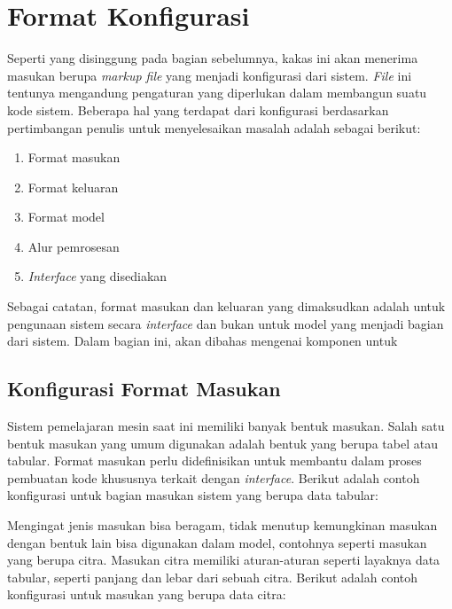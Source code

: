 \section{Format Konfigurasi}

Seperti yang disinggung pada bagian sebelumnya, kakas ini akan menerima masukan berupa \textit{markup file} yang menjadi konfigurasi dari sistem.
\textit{File} ini tentunya mengandung pengaturan yang diperlukan dalam membangun suatu kode sistem.
Beberapa hal yang terdapat dari konfigurasi berdasarkan pertimbangan penulis untuk menyelesaikan masalah adalah sebagai berikut:

\begin{enumerate}
	\item Format masukan
	\item Format keluaran
	\item Format model
	\item Alur pemrosesan
	\item \textit{Interface} yang disediakan
\end{enumerate}

Sebagai catatan, format masukan dan keluaran yang dimaksudkan adalah untuk pengunaan sistem secara \textit{interface} dan bukan untuk model yang menjadi bagian dari sistem.
Dalam bagian ini, akan dibahas mengenai komponen untuk 

\subsection{Konfigurasi Format Masukan}\label{section:03-input-format}

Sistem pemelajaran mesin saat ini memiliki banyak bentuk masukan.
Salah satu bentuk masukan yang umum digunakan adalah bentuk yang berupa tabel atau tabular.
Format masukan perlu didefinisikan untuk membantu dalam proses pembuatan kode khususnya terkait dengan \textit{interface}.
Berikut adalah contoh konfigurasi untuk bagian masukan sistem yang berupa data tabular:


Mengingat jenis masukan bisa beragam, tidak menutup kemungkinan masukan dengan bentuk lain bisa digunakan dalam model, contohnya seperti masukan yang berupa citra.
Masukan citra memiliki aturan-aturan seperti layaknya data tabular, seperti panjang dan lebar dari sebuah citra.
Berikut adalah contoh konfigurasi untuk masukan yang berupa data citra:


